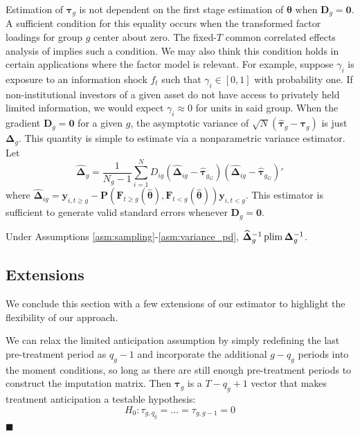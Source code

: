 Estimation of $\bm \tau_g$ is not dependent on the first stage estimation of $\bm{\theta}$ when $\bm D_g = \bm 0$. A sufficient condition for this equality occurs when the transformed factor loadings for group $g$ center about zero. The fixed-$T$ common correlated effects analysis of \citet{Westerlund_Petrova_Norkute_2019} implies such a condition. We may also think this condition holds in certain applications where the factor model is relevant. For example, suppose $\gamma_i$ is exposure to an information shock $f_t$ such that $\gamma_i \in [0,1]$ with probability one. If non-institutional investors of a given asset do not have access to privately held limited information, we would expect $\gamma_i \approx 0$ for units in said group. When the gradient $\bm D_g = \bm 0$ for a given $g$, the asymptotic variance of $\sqrt{N}(\widehat{\bm \tau}_g - \bm \tau_g)$ is just $\bm \Delta_g$. This quantity is simple to estimate via a nonparametric variance estimator. Let 
\begin{equation}\label{eq:nonparametric_variance}
  \widehat{\bm \Delta}_g = \frac{1}{N_g - 1} \sum_{i = 1}^N D_{ig} \left( \widehat{\bm \Delta}_{ig} - \widehat{\bm \tau}_{g_G} \right) \left( \widehat{\bm \Delta}_{ig} - \widehat{\bm \tau}_{g_G} \right)'
\end{equation}
where $\widehat{\bm \Delta}_{ig} = \bm y_{i, t \geq g} - \bm P(\bm{F}_{t \geq g}(\widehat{\bm{\theta}}), \bm{F}_{t < g}(\widehat{\bm{\theta}})) \bm y_{i, t < g}$. This estimator is sufficient to generate valid standard errors whenever $\bm D_g = \bm 0$.
\begin{theorem}\label{theorem:nonparametric_variance}
  Under Assumptions \ref{asm:sampling}-\ref{asm:variance_pd}, $\widehat{\bm \Delta}_g^{-1} \operatorname{plim} \bm \Delta_g^{-1}$.
\end{theorem}


\subsection{Extensions}

We conclude this section with a few extensions of our estimator to highlight the flexibility of our approach.

\begin{remark}
We can relax the limited anticipation assumption by simply redefining the last pre-treatment period as $q_g - 1$ and incorporate the additional $g - q_g$ periods into the moment conditions, so long as there are still enough pre-treatment periods to construct the imputation matrix. Then $\bm \tau_g$ is a $T - q_g + 1$ vector that makes treatment anticipation a testable hypothesis:
\begin{equation}
H_0: \tau_{g,q_g} = ... = \tau_{g,g-1} = 0 
\end{equation}
$\blacksquare$
\end{remark} 

